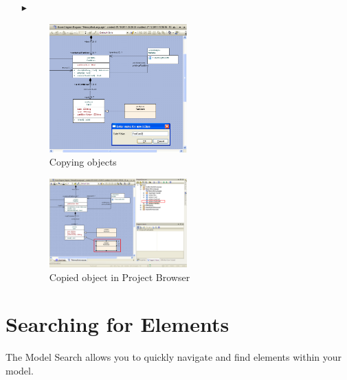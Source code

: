 \begin{enumerate}
\item[$\blacktriangleright$]
\begin{figure}[htbp]
\begin{center}
  \includegraphics[width=0.5\textwidth]{pics/tricks/copy/copy1}
  \caption{Copying objects}  
  \label{fig_copy01}
\end{center}
\end{figure}


\begin{figure}[htbp]
\begin{center}
  \includegraphics[width=0.5\textwidth]{pics/tricks/copy/copy2}
  \caption{Copied object in Project Browser}  
 
  \label{fig_copy02}
\end{center}
\end{figure}

\end{enumerate}


\section{Searching for Elements}
The Model Search allows you to quickly navigate and find elements within your
model.


